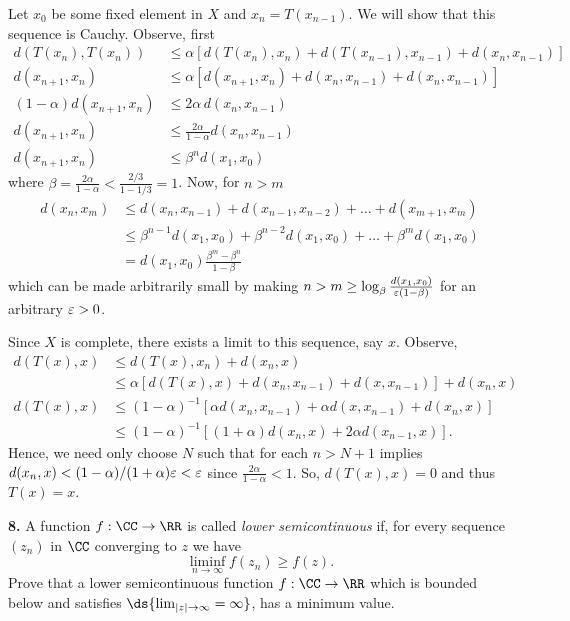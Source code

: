 \documentclass{homework}
\begin{document}
\begin{solution}
  Let $x_0$ be some fixed element in $X$ and $x_n = T(x_{n-1})$.  We will show that this sequence is Cauchy.  Observe, first
  \begin{align*}
    d(T(x_n),T(x_n)) &\le \alpha[ d(T(x_n),x_n) + d(T(x_{n-1}),x_{n-1}) + d(x_n,x_{n-1}) ]\\
    d(x_{n+1},x_n) &\le \alpha[ d(x_{n+1},x_n) + d(x_n,x_{n-1}) + d(x_n,x_{n-1}) ]\\
    (1-\alpha)d(x_{n+1},x_n) &\le 2\alpha\, d(x_n,x_{n-1})\\
    d(x_{n+1},x_n) &\le \frac{2\alpha}{1-\alpha} d(x_n,x_{n-1})\\
    d(x_{n+1},x_n) &\le \beta^n d(x_1,x_0)
  \end{align*}
  where $\beta = \frac{2\alpha}{1-\alpha} < \frac{2/3}{1 - 1/3} = 1$.
  Now, for $n>m$
  \begin{align*}
    d(x_n,x_m) 
    &\le d(x_n,x_{n-1}) + d(x_{n-1},x_{n-2}) + \dots +d(x_{m+1},x_m)\\
    &\le \beta^{n-1} d(x_1,x_0) + \beta^{n-2}d(x_1,x_0) + \dots + \beta^{m}d(x_1,x_0)\\
    &= d(x_1,x_0) \frac{\beta^m - \beta^n}{1-\beta}
  \end{align*}
  which can be made arbitrarily small by making $n>m\ge \log_\beta \frac{d(x_1,x_0)}{\varepsilon(1-\beta)}$ for an arbitrary $\varepsilon > 0$.

  Since $X$ is complete, there exists a limit to this sequence, say $x$.  Observe, 
  \begin{align*}
    d(T(x),x) 
    &\le d(T(x),x_n) + d(x_n,x) \\
    &\le \alpha[d(T(x),x) + d(x_n,x_{n-1}) + d(x,x_{n-1})] + d(x_n,x) \\
    d(T(x),x) 
    &\le (1-\alpha)^{-1}[\alpha d(x_n,x_{n-1}) + \alpha d(x,x_{n-1}) + d(x_n,x)]\\
    &\le (1-\alpha)^{-1}[(1 + \alpha )d(x_n,x) + 2\alpha d(x_{n-1},x)].
  \end{align*}
  Hence, we need only choose $N$ such that for each $n>N+1$ implies $d(x_n,x) < (1-\alpha)/(1+\alpha)\varepsilon < \varepsilon$ since $\frac {2\alpha}{1-\alpha} < 1$. So, $d(T(x),x) = 0$ and thus $T(x) = x$.
\end{solution}

{\bf 8.} A function $f:\CC \to \RR$ is called \emph{lower semicontinuous} if, for every sequence $(z_n)$ in $\CC$ converging to $z$ we have
$$
  \liminf_{n\to\infty} f(z_n) \ge f(z).
$$
Prove that a lower semicontinuous function $f:\CC\to \RR$ which is bounded below and satisfies $\ds{\lim_{|z|\to \infty} = \infty}$, has a minimum value.
\end{document}

